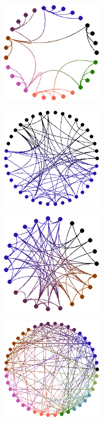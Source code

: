 \documentclass[12pt, a4paper]{article}
\begin{document}
\begin{center}
\begin{figure}[H]
\centering\includegraphics[width=5cm]{./cloud01.jpg}\\
\end{figure}
\end{center}
\begin{center}
\begin{figure}[H]
\centering\includegraphics[width=5cm]{./cloud02.jpg}\\
\end{figure}
\end{center}
\begin{center}
\begin{figure}[H]
\centering\includegraphics[width=5cm]{./cloud03.jpg}\\
\end{figure}
\end{center}
\begin{center}
\begin{figure}[H]
\centering\includegraphics[width=5cm]{./cloud04.jpg}\\
\end{figure}
\end{center}
\end{document}
